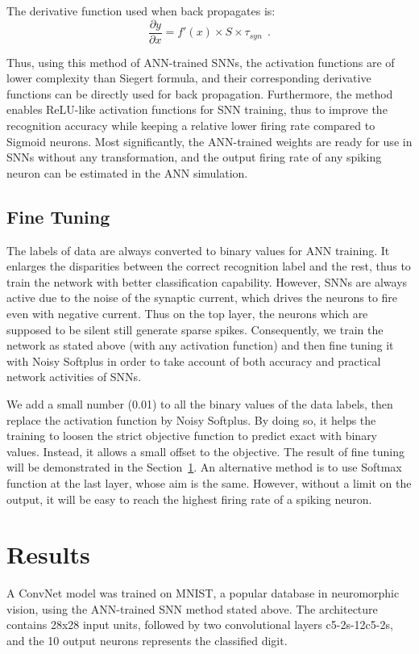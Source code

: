 	
	
	The derivative function used when back propagates is:
	\begin{equation}
	\frac{\partial y}{\partial x} = f'(x) \times S \times \tau_{syn}~~.
	\end{equation}
	

	
	Thus, using this method of ANN-trained SNNs, the activation functions are of lower complexity than Siegert formula, and their corresponding derivative functions can be directly used for back propagation.
	Furthermore, the method enables ReLU-like activation functions for SNN training, thus to improve the recognition accuracy while keeping a relative lower firing rate compared to Sigmoid neurons. 
	Most significantly, the ANN-trained weights are ready for use in SNNs without any transformation, and the output firing rate of any spiking neuron can be estimated in the ANN simulation.
	
	
	\subsection{Fine Tuning}
	The labels of data are always converted to binary values for ANN training.
	It enlarges the disparities between the correct recognition label and the rest, thus to train the network with better classification capability.
	However, SNNs are always active due to the noise of the synaptic current, which drives the neurons to fire even with negative current.
	Thus on the top layer, the neurons which are supposed to be silent still generate sparse spikes.
	Consequently, we train the network as stated above (with any activation function) and then fine tuning it with Noisy Softplus in order to take account of both accuracy and practical network activities of SNNs.
	
	We add a small number (0.01) to all the binary values of the data labels,	then replace the activation function by Noisy Softplus.
	By doing so, it helps the training to loosen the strict objective function to predict exact with binary values.
	Instead, it allows a small offset to the objective.
	The result of fine tuning will be demonstrated in the Section~\ref{sec:iconipResult}.
	An alternative method is to use Softmax function at the last layer, whose aim is the same.
	However, without a limit on the output, it will be easy to reach the highest firing rate of a spiking neuron.
	
\section{Results}
\label{sec:iconipResult}
	A ConvNet model was trained on MNIST,
	a popular database in neuromorphic vision, using the ANN-trained SNN method stated above.
	The architecture contains 28x28 input units, followed by two convolutional layers c5-2s-12c5-2s, and the 10 output neurons represents the classified digit.
	
